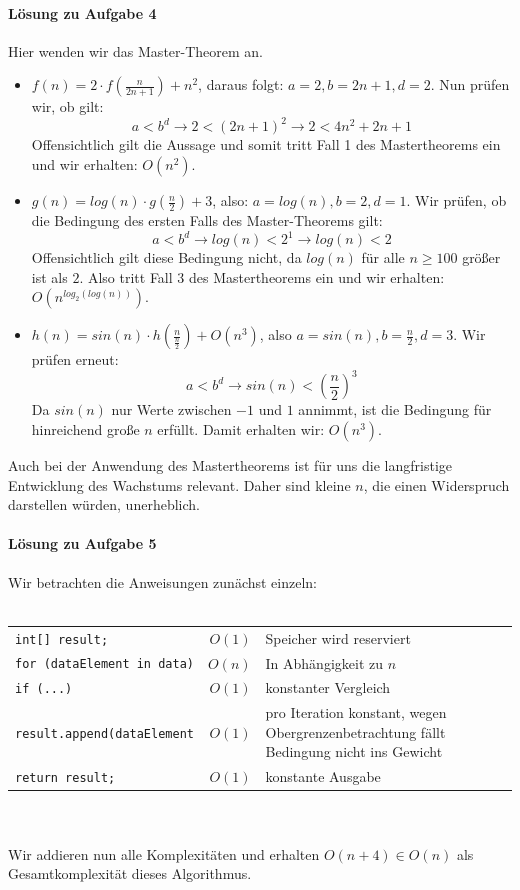 \documentclass[11pt,a4paper]{scrartcl}
\begin{document}
\paragraph{Lösung zu Aufgabe 4} \label{a4:lsg}
Hier wenden wir das Master-Theorem an.
\begin{itemize}
\item $f(n) = 2 \cdot f(\frac{n}{2n+1}) + n^{2}$, daraus folgt: $a = 2, b = 2n + 1, d = 2$. Nun prüfen wir, ob gilt: \[a < b^d \to 2 < (2n+1)^2 \to 2 < 4n^2 + 2n + 1\]
Offensichtlich gilt die Aussage und somit tritt Fall 1 des Mastertheorems ein und wir erhalten: $O(n^2)$.
\item $g(n) = log(n) \cdot g(\frac{n}{2}) + 3$, also: $a = log(n), b = 2, d = 1$. Wir prüfen, ob die Bedingung des ersten Falls des Master-Theorems gilt:
\[a < b^d \to log(n) < 2^1 \to log(n) < 2\]
Offensichtlich gilt diese Bedingung nicht, da $log(n)$ für alle $n \geq 100$ größer ist als $2$. Also tritt Fall 3 des Mastertheorems ein und wir erhalten: $O(n^{log_2(log(n))})$.
\item $h(n) = sin(n) \cdot h(\frac{n}{\frac{n}{2}}) + O(n^{3})$, also $a = sin(n), b = \frac{n}{2}, d = 3$. Wir prüfen erneut: \[
a < b^d \to sin(n) < (\frac{n}{2})^3\]
Da $sin(n)$ nur Werte zwischen $-1$ und $1$ annimmt, ist die Bedingung für hinreichend große $n$ erfüllt. Damit erhalten wir: $O(n^3)$.
\end{itemize}
Auch bei der Anwendung des Mastertheorems ist für uns die langfristige Entwicklung des Wachstums relevant. Daher sind kleine $n$, die einen Widerspruch darstellen würden, unerheblich.
\paragraph{Lösung zu Aufgabe 5} \label{a1.5:lsg}
Wir betrachten die Anweisungen zunächst einzeln: \\\\
\begin{tabular}{lrp{5cm}}
\texttt{int[] result;} & $O(1)$ & Speicher wird reserviert \\
\texttt{for (dataElement in data)} & $O(n)$ & In Abhängigkeit zu $n$ \\
\texttt{if (...)} & $O(1)$ & konstanter Vergleich \\
\texttt{result.append(dataElement} & $O(1)$ & pro Iteration konstant, wegen Obergrenzenbetrachtung fällt Bedingung nicht ins Gewicht \\
\texttt{return result;} & $O(1)$ & konstante Ausgabe \\
\end{tabular} \\\\
Wir addieren nun alle Komplexitäten und erhalten $O(n + 4) \in O(n)$ als Gesamtkomplexität dieses Algorithmus.
\end{document}
